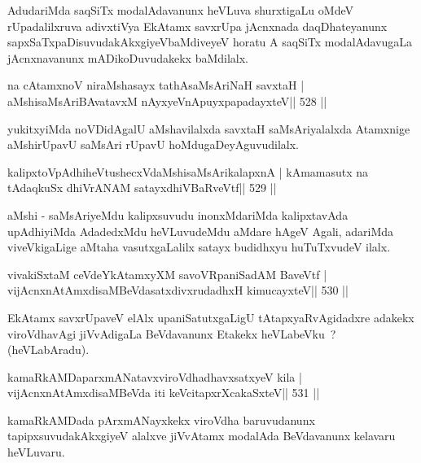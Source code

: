 \begin{artha}
AdudariMda saqSiTx modalAdavanunx heVLuva shurxtigaLu oMdeV rUpadalilxruva adivxtiVya EkAtamx savxrUpa jAcnxnada daqDhateyanunx sapxSaTxpaDisuvudakAkxgiyeV\break baMdiveyeV horatu A saqSiTx modalAdavugaLa jAcnxnavanunx mADikoDuvudakekx baMdilalx.
\end{artha}


\begin{shl}
na cA\s\s tamxnoV niraMshasayx tathA\s saMsAriNaH savxtaH |
aMshisaMsAriBAvatavxM nAyxyeVnApuyxpapadayxteV\hfill || 528 ||
\end{shl}

\begin{artha}
yukitxyiMda noVDidAgalU aMshavilalxda savxtaH saMsAriyalalxda Atamxnige aMshirUpavU saMsAri rUpavU hoMdugaDeyAguvudilalx.
\end{artha}

\begin{shl}
kalipxtoVpAdhiheVtushecxVdaMshisaMsArikalapxnA |
kAmamasutx na tAdaqkuSx dhiVrANAM satayxdhiVBaRveVtf\hfill || 529 ||
\end{shl}

\begin{artha}
aMshi - saMsAriyeMdu kalipxsuvudu inonxMdariMda kalipxtavAda upAdhiyiMda AdadedxMdu heVLuvudeMdu aMdare hAgeV Agali, adariMda viveVkigaLige aMtaha vasutxgaLalilx satayx budidhxyu huTuTxvudeV ilalx.
\end{artha}

\begin{shl}
vivakiSxtaM ceVdeYkAtamxyXM savoVRpaniSadAM BaveVtf |
vijAcnxnAtAmxdisaMBeVdasatxdivxrudadhxH kimucayxteV\hfill || 530 ||
\end{shl}

\begin{artha}
EkAtamx savxrUpaveV elAlx upaniSatutxgaLigU tAtapxyaRvAgidadxre adakekx viroVdhavAgi jiVvAdigaLa BeVdavanunx Etakekx heVLabeVku~? (heVLabAradu).
\end{artha}


\begin{shl}
kamaRkAMDaparxmANatavxviroVdhadhavxsatxyeV kila |
vijAcnxnAtAmxdisaMBeVda iti keVcitapxrXcakaSxteV\hfill || 531 ||
\end{shl}

\begin{artha}
kamaRkAMDada pArxmANayxkekx viroVdha baruvudanunx tapipxsuvudakAkxgiyeV alalxve jiVvAtamx modalAda BeVdavanunx kelavaru heVLuvaru.
\end{artha}

